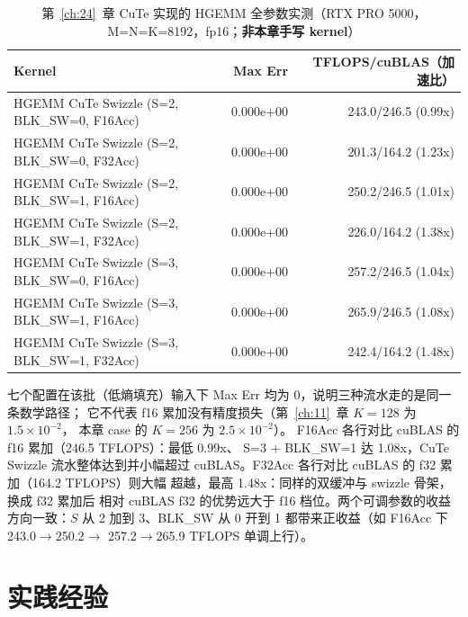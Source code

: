 \begin{table}[H]
\centering
\caption{第~\ref{ch:24}~章 CuTe 实现的 HGEMM 全参数实测（RTX PRO 5000，M=N=K=8192，fp16；\textbf{非本章手写 kernel}）}
\label{tab:ch12-perf}
\small
\setlength{\tabcolsep}{4pt}
\begin{tabular}{lrr}
\toprule
Kernel & Max Err & TFLOPS/cuBLAS（加速比） \\
\midrule
HGEMM CuTe Swizzle (S=2, BLK\_SW=0, F16Acc) & 0.000e+00 & 243.0/246.5 (0.99x) \\
HGEMM CuTe Swizzle (S=2, BLK\_SW=0, F32Acc) & 0.000e+00 & 201.3/164.2 (1.23x) \\
HGEMM CuTe Swizzle (S=2, BLK\_SW=1, F16Acc) & 0.000e+00 & 250.2/246.5 (1.01x) \\
HGEMM CuTe Swizzle (S=2, BLK\_SW=1, F32Acc) & 0.000e+00 & 226.0/164.2 (1.38x) \\
HGEMM CuTe Swizzle (S=3, BLK\_SW=0, F16Acc) & 0.000e+00 & 257.2/246.5 (1.04x) \\
HGEMM CuTe Swizzle (S=3, BLK\_SW=1, F16Acc) & 0.000e+00 & 265.9/246.5 (1.08x) \\
HGEMM CuTe Swizzle (S=3, BLK\_SW=1, F32Acc) & 0.000e+00 & 242.4/164.2 (1.48x) \\
\bottomrule
\end{tabular}
\end{table}

七个配置在该批（低熵填充）输入下 Max Err 均为 $0$，说明三种流水走的是同一条数学路径；
它不代表 f16 累加没有精度损失（第~\ref{ch:11}~章 $K{=}128$ 为 $1.5\times10^{-2}$，
本章 case 的 $K{=}256$ 为 $2.5\times10^{-2}$）。
F16Acc 各行对比 cuBLAS 的 f16 累加（246.5 TFLOPS）：最低 0.99x、
S=3 + BLK\_SW=1 达 1.08x，CuTe Swizzle 流水整体达到并小幅超过
cuBLAS。F32Acc 各行对比 cuBLAS 的 f32 累加（164.2 TFLOPS）则大幅
超越，最高 1.48x：同样的双缓冲与 swizzle 骨架，换成 f32 累加后
相对 cuBLAS f32 的优势远大于 f16 档位。两个可调参数的收益方向一致：$S$ 从 2
加到 3、BLK\_SW 从 0 开到 1 都带来正收益（如 F16Acc 下 243.0$\to$250.2$\to$
257.2$\to$265.9 TFLOPS 单调上行）。

\section{实践经验}

